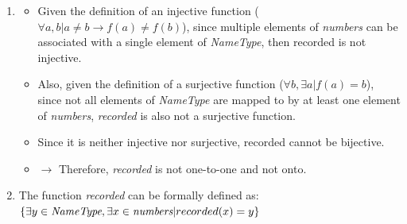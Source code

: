 \begin{enumerate}
\item 
    \begin{itemize}
        \item Given the definition of an injective function ($\forall a, b | a \neq b \rightarrow f(a) \neq f(b) $), since multiple elements of \emph{numbers} can be associated with a single element of \emph{NameType}, then recorded is not injective. 
        \item Also, given the definition of a surjective function ($\forall b,   \exists a | f(a) = b$), since not all elements of \emph{NameType} are mapped to by at least one element of \emph{numbers}, \emph{recorded} is also not a surjective function. 

        \item Since it is neither injective nor surjective, recorded cannot be bijective. 
        \item[] $\rightarrow$ Therefore, \emph{recorded} is not one-to-one and not onto. 
    \end{itemize}

\item The function \emph{recorded} can be formally defined as:\\
$\{ \exists y \in \emph{NameType},   \exists x \in \emph{numbers} | recorded(x) = y \}$

\end{enumerate}
